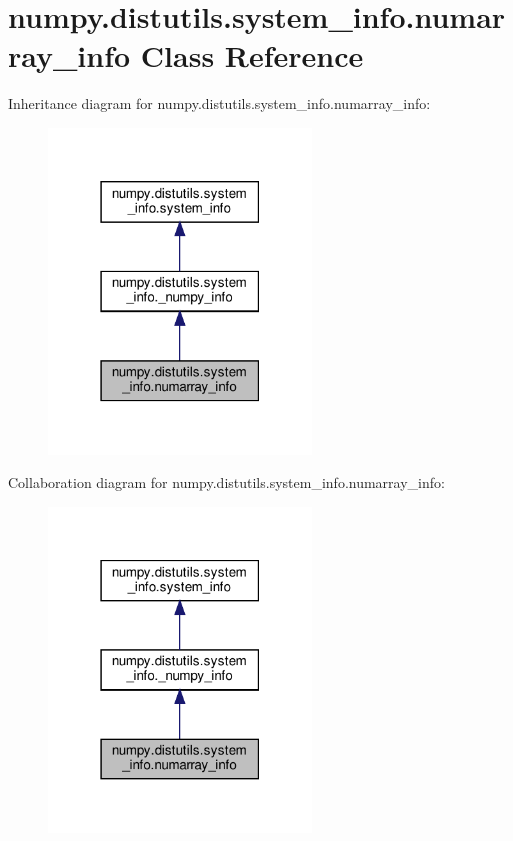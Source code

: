 \hypertarget{classnumpy_1_1distutils_1_1system__info_1_1numarray__info}{}\section{numpy.\+distutils.\+system\+\_\+info.\+numarray\+\_\+info Class Reference}
\label{classnumpy_1_1distutils_1_1system__info_1_1numarray__info}


Inheritance diagram for numpy.\+distutils.\+system\+\_\+info.\+numarray\+\_\+info\+:
\nopagebreak
\begin{figure}[H]
\begin{center}
\leavevmode
\includegraphics[width=198pt]{classnumpy_1_1distutils_1_1system__info_1_1numarray__info__inherit__graph}
\end{center}
\end{figure}


Collaboration diagram for numpy.\+distutils.\+system\+\_\+info.\+numarray\+\_\+info\+:
\nopagebreak
\begin{figure}[H]
\begin{center}
\leavevmode
\includegraphics[width=198pt]{classnumpy_1_1distutils_1_1system__info_1_1numarray__info__coll__graph}
\end{center}
\end{figure}
